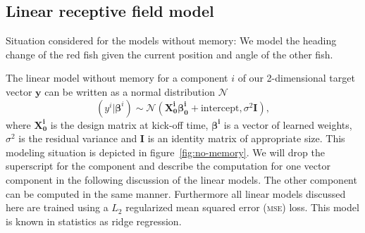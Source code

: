 \documentclass[nobib, a4paper]{tufte-handout}
\begin{document}
\subsection{Linear receptive field model}
\begin{marginfigure}
 \caption{Situation considered for the models without memory:
 We model the heading change of the red fish given the current position and angle of the other fish.}
\label{fig:no-memory}
\end{marginfigure}

The linear model without memory for a component \(i\) of our 2-dimensional target vector \(\bm{y}\) can be written as a normal distribution \(\mathcal{N}\)
\begin{equation*}
 \left( y^i | \bm{\beta}^{i} \right)  \sim \mathcal{N} \left( \bm{X^i_0} \bm{\beta^i_0} + \text{intercept}, \sigma^2 \bm{I}  \right),
\end{equation*}
where \(\bm{X^i_0}\) is the design matrix at kick-off time, \(\bm{\beta^i}\) is a vector of learned weights, \(\sigma^2\) is the residual variance and \(\bm{I}\) is an identity matrix of appropriate size.
This modeling situation is depicted in figure~\ref{fig:no-memory}.
We will drop the superscript for the component and describe the computation for one vector component in the following discussion of the linear models.
The other component can be computed in the same manner.
Furthermore all linear models discussed here are trained using a $L_2$ regularized mean squared error (\textsc{mse}) loss.
This model is known in statistics as ridge regression.
\end{document}

